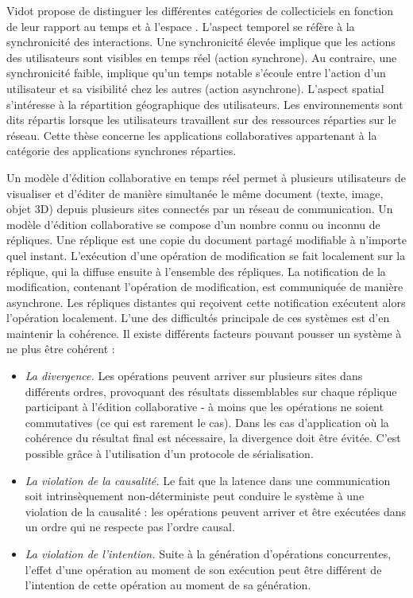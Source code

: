 Vidot propose de distinguer les différentes catégories de collecticiels en fonction 
de leur rapport au temps et à l'espace \cite{Vidot2002}. 
L'aspect temporel se réfère à la synchronicité des interactions. 
Une synchronicité élevée implique que les actions des utilisateurs sont visibles en 
temps réel (action synchrone). 
Au contraire, une synchronicité faible, implique qu'un temps notable s'écoule entre 
l'action d'un utilisateur et sa visibilité chez les autres (action asynchrone). L'aspect 
spatial s'intéresse à la répartition géographique des utilisateurs. Les 
environnements sont dits répartis lorsque les utilisateurs travaillent sur des ressources 
réparties sur le réseau. Cette thèse concerne les applications collaboratives appartenant à la 
catégorie des applications synchrones réparties.

Un modèle d'édition collaborative en temps réel permet à plusieurs utilisateurs de 
visualiser et d'éditer de manière simultanée le même document (texte, image, 
objet \gls{3D}) depuis plusieurs sites connectés par un réseau de communication. 
Un modèle d'édition collaborative se compose d'un nombre connu ou inconnu de répliques. 
Une réplique est une copie du document partagé modifiable à n'importe quel 
instant. L'exécution d'une opération de modification se fait localement sur la 
réplique, qui la diffuse ensuite à l'ensemble des répliques. La notification de la 
modification, contenant l'opération de modification, est communiquée de manière 
asynchrone. Les répliques distantes qui reçoivent cette notification exécutent 
alors l'opération localement. L'une des difficultés principale de ces systèmes 
est d'en maintenir la cohérence. Il existe différents facteurs pouvant 
pousser un système à ne plus être cohérent :
\begin{itemize}
	\item \textit{La divergence.} Les opérations peuvent arriver sur plusieurs sites 
	dans différents ordres, provoquant des résultats dissemblables sur chaque réplique 
	participant à l'édition collaborative - à moins que les opérations ne soient 
	commutatives (ce qui est rarement le cas). Dans les cas d'application où la 
	cohérence du résultat final est nécessaire, la divergence doit être évitée. C'est possible grâce à l'utilisation d'un protocole de 
	sérialisation.
	\item \textit{La violation de la causalité.} Le fait que la latence dans une 
	communication 
	soit intrinsèquement non-déterministe peut conduire le système à une violation de 
	la causalité : les opérations peuvent arriver et être exécutées dans un ordre 
	qui ne respecte pas l'ordre causal.
	\item \textit{La violation de l'intention.} Suite à la génération d'opérations 
	concurrentes, 
	l'effet d'une opération au moment de son exécution peut être différent de 
	l'intention de cette opération au moment de sa génération.
\end{itemize}

